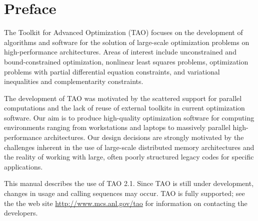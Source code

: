 
\section*{Preface}

The Toolkit for Advanced Optimization (TAO) focuses on the development
of algorithms and software for the solution of large-scale optimization 
problems on high-performance architectures.  Areas of interest include 
unconstrained and bound-constrained optimization, nonlinear least squares 
problems, optimization problems with partial differential equation 
constraints, and variational inequalities and complementarity 
constraints.

The development of TAO was motivated by the scattered support for
parallel computations and the lack of reuse of external toolkits in
current optimization software.  Our aim is to produce high-quality 
optimization software for computing environments ranging from 
workstations and laptops to massively parallel high-performance 
architectures.  Our design decisions are strongly motivated by 
the challenges inherent in the use of large-scale distributed 
memory architectures and the reality of working with large, 
often poorly structured legacy codes for specific 
applications.

This manual describes the use of TAO 2.1.  Since TAO is still under 
development, changes in usage and calling sequences may occur.  TAO 
is fully supported; see the the web site \url{http://www.mcs.anl.gov/tao} 
for information on contacting the developers.


